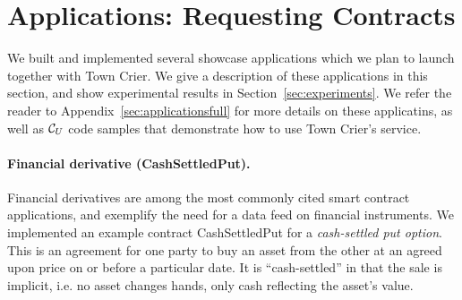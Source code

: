 \section{Applications: Requesting Contracts}
\label{sec:applications}

We built and implemented several showcase applications which we plan
to launch together with Town Crier.
We give a description of these applications in this section,
and show experimental results in Section~\ref{sec:experiments}.
We refer the reader to Appendix~\ref{sec:applicationsfull}
for more details on these applicatins,
as well as ${\cal C}_U$ code samples that demonstrate
how to use Town Crier's service.


\paragraph{Financial derivative ({\sf CashSettledPut}).}
Financial derivatives are among the most commonly cited smart contract
applications,
and exemplify the need for a data feed on financial instruments.
We implemented an example contract {\sf CashSettledPut} for a {\em cash-settled put option}.
This is an agreement for one party to buy an asset from the other at an agreed upon price on or before a particular date.
It is ``cash-settled'' in that the sale is implicit, i.e. no asset changes hands, only cash reflecting the asset's value.
%
\iffalse
